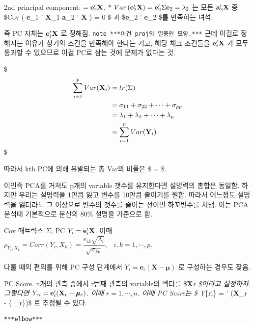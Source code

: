 \documentclass[
]{book}
\begin{document}
{{2nd principal component: \(= \textbf e_2 ' \textbf X\).
* \(Var \left( \textbf e_2 ' \textbf X \right)= \textbf e_2 ' \Sigma \textbf e_2 = \lambda_2\) 는 모든 \(\textbf a_2 ' \textbf X\) 중 \$Cov \left( \textbf e\_1 ' \textbf X\_1 \textbf a\_2 ' \textbf X \right) = 0 \$ 과 \$\textbf e\_2 ' \textbf e\_2 \$를 만족하는 녀석.

즉 PC 자체는 \(\textbf e_i ' \textbf X\) 로 정해짐. \texttt{note\ ***이건\ proj의\ 일종인\ 모양.***} 근데 이걸로 정해지는 이유가 상기의 조건을 만족해야 한다는 거고, 해당 체크 조건들을 \(\textbf e_i ' \textbf X\) 가 모두 통과할 수 있으므로 이걸 PC로 삼는 것에 문제가 없다는 것.

\$
\begin{align*}

    \sum_{i=1}^p Var(\textbf X_i) &=tr(\Sigma) \\
    &= \sigma_{11} + \sigma_{22} + \cdots + \sigma_{pp} \\
    &= \lambda_1 + \lambda_2 + \cdots + \lambda_p \\
    &= \sum_{i=1}^p Var(\textbf Y_i)


\end{align*}
\$

따라서 kth PC에 의해 유발되는 총 Var의 비율은 \$ =  \$.

이인즉 PCA를 거쳐도 p개의 variable 갯수를 유지한다면 설명력의 총합은 동일함. 하지만 우리는 설명력을 1만큼 잃고 변수를 10만큼 줄이기를 원함. 따라서 어느정도 설명력을 잃더라도 그 이상으로 변수의 갯수를 줄이는 선이면 하꼬변수를 쳐냄. 이는 PCA 분석때 기본적으로 분산의 80\% 설명을 기준으로 함.

Cov 매트릭스 \(\Sigma\), PC \(Y_i = \textbf e_i ' \textbf X\). 이때 \(\rho_{Y_i , X_k } = Corr (Y_i , X_k ) = \dfrac {e_{ik} \sqrt{\lambda_i}} {\sqrt{\sigma_{kk}}}, \; \; \; i,k=1,\cdots,p\).

다룰 때의 편의를 위해 PC 구성 단계에서 \(Y_i =\textbf {e}_i ( \pmb {X} - \pmb {\mu} )\) 로 구성하는 경우도 잦음.

PC Score. n개의 관측 중에서 r번째 관측의 variable의 벡터를 \$\textbf X\emph{r \$이라고 설정하자. 그렇다면 \(Y_{ri} = \textbf e_i ' (\textbf X_r - \pmb \mu_r)\). 이때 \(r=1,\cdots, n\). 이때 PC Score는 \$ \hat Y}\{ri\} =  ' (\textbf X\_r - \{ \hat {\pmb  \mu}\_r\})\$ 로 추정될 수 있다.

\begin{verbatim}
***elbow***
\end{verbatim}

}}
\end{document}
